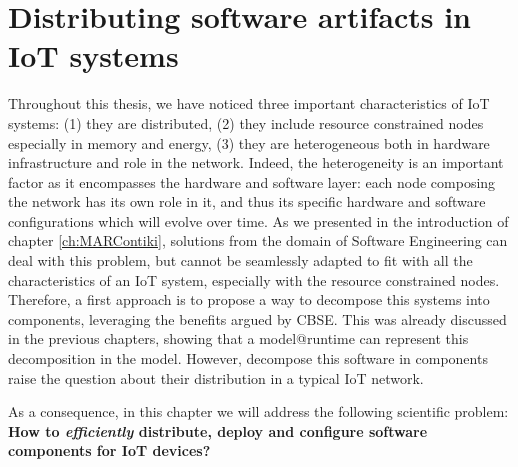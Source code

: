 \chapter{Distributing software artifacts in IoT systems}
\label{ch:softArtDist}
Throughout this thesis, we have noticed three important characteristics of IoT systems: (1) they are distributed, (2) they include resource constrained nodes especially in memory and energy, (3) they are heterogeneous both in hardware infrastructure and role in the network. 
Indeed, the heterogeneity is an important factor as it encompasses the hardware and software layer: each node composing the network has its own role in it, and thus its specific hardware and software configurations which will evolve over time.
As we presented in the introduction of chapter \ref{ch:MARContiki}, solutions from the domain of Software Engineering can deal with this problem, but cannot be seamlessly adapted to fit with all the characteristics of an IoT system, especially with the resource constrained nodes.
Therefore, a first approach is to propose a way to decompose this systems into components, leveraging the benefits argued by CBSE. This was already discussed in the previous chapters, showing that a model@runtime can represent this decomposition in the model.
However, decompose this software in components raise the question about their distribution in a typical IoT network.

As a consequence, in this chapter we will address the following scientific problem: \textbf{How to \textit{efficiently} distribute, deploy and configure software components for IoT devices?}

